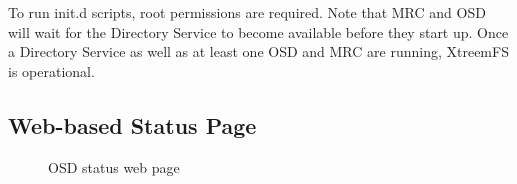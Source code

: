 \documentclass[a4paper,10pt]{book}
\begin{document}
To run init.d scripts, root permissions are required. Note that MRC and OSD will wait for the Directory Service to become available before they start up. Once a Directory Service as well as at least one OSD and MRC are running, XtreemFS is operational.

% 
% 

\subsection{Web-based Status Page}

\begin{figure}[h]
 \centering
 \caption{OSD status web page}
 \label{fig:screenshot_status}
\end{figure}
\end{document}
